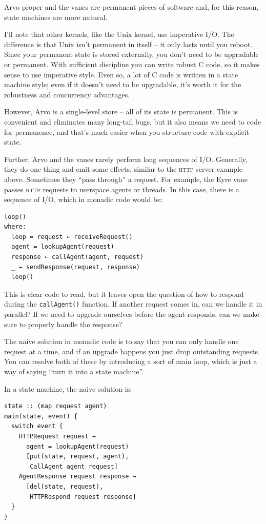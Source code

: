 \documentclass[twoside]{article}
\begin{document}
Arvo proper and the vanes are permanent pieces of software and, for this
reason, state machines are more natural.

I'll note that other kernels, like the Unix kernel, use imperative I/O.
The difference is that Unix isn't permanent in itself -- it only lasts
until you reboot. Since your permanent state is stored externally, you
don't need to be upgradable or permanent. With sufficient discipline you
can write robust C code, so it makes sense to use imperative style. Even
so, a lot of C code is written in a state machine style; even if it
doesn't need to be upgradable, it's worth it for the robustness and
concurrency advantages.

However, Arvo is a single-level store -- all of its state is permanent.
This is convenient and eliminates many long-tail bugs, but it also
means we need to code for permanence, and that's much easier when you
structure code with explicit state.

Further, Arvo and the vanes rarely perform long sequences of I/O.
Generally, they do one thing and emit some effects, similar to the \textsc{http}
server example above. Sometimes they ``pass through'' a request. For
example, the Eyre vane passes \textsc{http} requests to userspace agents or
threads. In this case, there is a sequence of I/O, which in monadic code
would be:

\begin{lstlisting}[style=listingblock]
loop()
where:
  loop = request ← receiveRequest()
  agent = lookupAgent(request)
  response ← callAgent(agent, request)
  _ ← sendResponse(request, response)
  loop()
\end{lstlisting}

\noindent
This is clear code to read, but it leaves open the question of how to
respond during the \texttt{callAgent()} function. If another request comes in,
can we handle it in parallel? If we need to upgrade ourselves before the
agent responds, can we make sure to properly handle the response?

The naive solution in monadic code is to say that you can only handle
one request at a time, and if an upgrade happens you just drop
outstanding requests. You can resolve both of these by introducing a
sort of main loop, which is just a way of saying ``turn it into a state
machine''.

In a state machine, the naive solution is:

\begin{lstlisting}[style=listingblock]
state :: (map request agent)
main(state, event) {
  switch event {
    HTTPRequest request →
      agent = lookupAgent(request)
      [put(state, request, agent),
       CallAgent agent request]
    AgentResponse request response →
      [del(state, request),
       HTTPRespond request response]
  }
}
\end{lstlisting}
\end{document}
